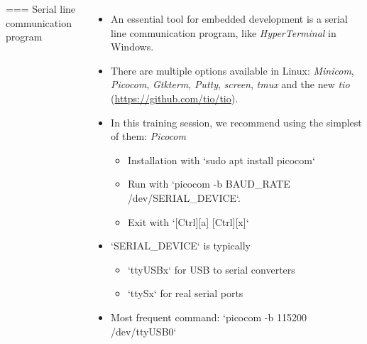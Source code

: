 \begin{columns}
=== Serial line communication program
  \begin{itemize}
  \item An essential tool for embedded development is a serial line
    communication program, like {\em HyperTerminal} in Windows.
  \item There are multiple options available in Linux: {\em Minicom},
    {\em Picocom}, {\em Gtkterm}, {\em Putty}, {\em screen}, {\em tmux}
    and the new {\em tio} (\url{https://github.com/tio/tio}).
  \item In this training session, we recommend using the simplest of
    them: {\em Picocom}
    \begin{itemize}
    \item Installation with `sudo apt install picocom`
    \item Run with `picocom -b BAUD_RATE /dev/SERIAL_DEVICE`.
    \item Exit with `[Ctrl][a] [Ctrl][x]`
    \end{itemize}
  \item `SERIAL_DEVICE` is typically
    \begin{itemize}
    \item `ttyUSBx` for USB to serial converters
    \item `ttySx` for real serial ports
    \end{itemize}
  \item Most frequent command: `picocom -b 115200 /dev/ttyUSB0`
  \end{itemize}
\end{columns}